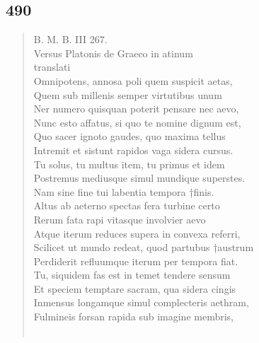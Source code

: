 \documentclass[11pt, a4paper]{report}
\begin{document}
            \subsection*{490}
      \begin{verse}
      B. M. B. III 267. \\ Versus Platonis de Graeco in atinum \\ translati \\ Omnipotens, annosa poli quem suspicit aetas, \\ Quem sub millenis semper virtutibus unum \\ Ner numero quisquan poterit pensare nec aevo, \\ Nunc esto affatus, si quo te nomine dignum est, \\ Quo sacer ignoto gaudes, quo maxima tellus \\ Intremit et sistunt rapidos vaga sidera cursus. \\ Tu solus, tu multus item, tu primus et idem \\ Postremus mediusque simul mundique superstes. \\ Nam sine fine tui labentia tempora †finis. \\ Altus ab aeterno spectas fera turbine certo \\ Rerum fata rapi vitasque involvier aevo \\ Atque iterum reduces supera in convexa referri, \\ Scilicet ut mundo redeat, quod partubus †austrum \\ Perdiderit refluumque iterum per tempora fiat. \\ Tu, siquidem fas est in temet tendere sensum \\ Et speciem temptare sacram, qua sidera cingis \\ Inmensus longamque simul complecteris aethram, \\ Fulmineis forsan rapida sub imagine membris, \\ 
        ﻿\pagebreak 

\end{verse}
\end{document}
